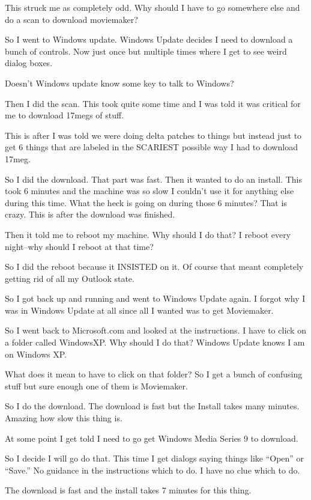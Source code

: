 This struck me as completely odd.
Why should I have to go somewhere else and do a scan to download moviemaker?

So I went to Windows update.
Windows Update decides I need to download a bunch of controls.
Now just once but multiple times where I get to see weird dialog boxes.

Doesn't Windows update know some key to talk to Windows?

Then I did the scan.
This took quite some time and I was told it was critical for me to download
17megs of stuff.

This is after I was told we were doing delta patches to things but instead
just to get 6 things that are labeled in the SCARIEST possible way I had to
download 17meg.

So I did the download.
That part was fast.
Then it wanted to do an install.
This took 6 minutes and the machine was so slow I couldn't use it for
anything else during this time.  What the heck is going on during those 6
minutes?
That is crazy.
This is after the download was finished.

Then it told me to reboot my machine.
Why should I do that?
I reboot every night--why should I reboot at that time?

So I did the reboot because it INSISTED on it.
Of course that meant completely getting rid of all my Outlook state.

So I got back up and running and went to Windows Update again.
I forgot why I was in Windows Update at all since all I wanted was to get
Moviemaker.

So I went back to Microsoft.com and looked at the instructions.
I have to click on a folder called WindowsXP.
Why should I do that?
Windows Update knows I am on Windows XP.

What does it mean to have to click on that folder?
So I get a bunch of confusing stuff but sure enough one of them is
Moviemaker.

So I do the download.
The download is fast but the Install takes many minutes.
Amazing how slow this thing is.

At some point I get told I need to go get Windows Media Series 9 to download.

So I decide I will go do that.
This time I get dialogs saying things like ``Open'' or ``Save.''
No guidance in the instructions which to do.
I have no clue which to do.

The download is fast and the install takes 7 minutes for this thing.

